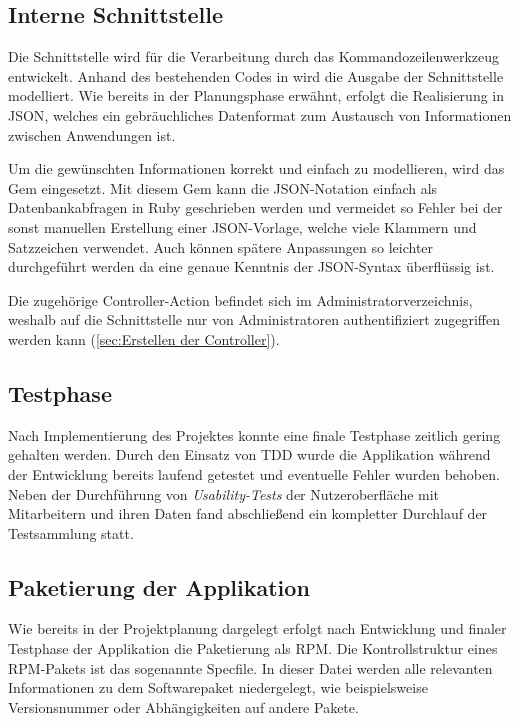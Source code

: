 \subsection{Interne Schnittstelle}
\label{sec:Interne Schnittstelle}
Die Schnittstelle wird für die Verarbeitung durch das Kommandozeilenwerkzeug  entwickelt.
Anhand des bestehenden Codes in  wird die Ausgabe der Schnittstelle modelliert.
Wie bereits in der Planungsphase erwähnt, erfolgt die Realisierung in \acs{JSON},
welches ein gebräuchliches Datenformat zum Austausch von Informationen zwischen Anwendungen ist.

Um die gewünschten Informationen korrekt und einfach zu modellieren, wird das Gem 
eingesetzt. Mit diesem Gem kann die JSON-Notation einfach als Datenbankabfragen in Ruby
geschrieben werden und vermeidet so Fehler bei der sonst manuellen Erstellung einer JSON-Vorlage,
welche viele Klammern und Satzzeichen verwendet. Auch können spätere Anpassungen so leichter
durchgeführt werden da eine genaue Kenntnis der JSON-Syntax überflüssig ist.

Die zugehörige Controller-Action befindet sich im Administratorverzeichnis, weshalb auf die Schnittstelle
nur von Administratoren authentifiziert zugegriffen werden kann (\Vgl \ref{sec:Erstellen der Controller}).

\subsection{Testphase}
\label{sec:Testphase}
Nach Implementierung des Projektes konnte eine finale Testphase zeitlich gering gehalten werden.
Durch den Einsatz von \acs{TDD} wurde die Applikation während der Entwicklung bereits laufend
getestet und eventuelle Fehler wurden behoben. Neben der Durchführung von \textit{Usability-Tests}
der Nutzeroberfläche mit Mitarbeitern und ihren Daten fand abschließend ein kompletter
Durchlauf der Testsammlung statt.

\subsection{Paketierung der Applikation}
\label{sec:Paketierung der Applikation}
Wie bereits in der Projektplanung dargelegt erfolgt nach Entwicklung und finaler Testphase der
Applikation die Paketierung als RPM. Die Kontrollstruktur eines RPM-Pakets ist das sogenannte
Specfile. In dieser Datei werden alle relevanten Informationen zu dem Softwarepaket niedergelegt,
wie beispielsweise Versionsnummer oder Abhängigkeiten auf andere Pakete.

